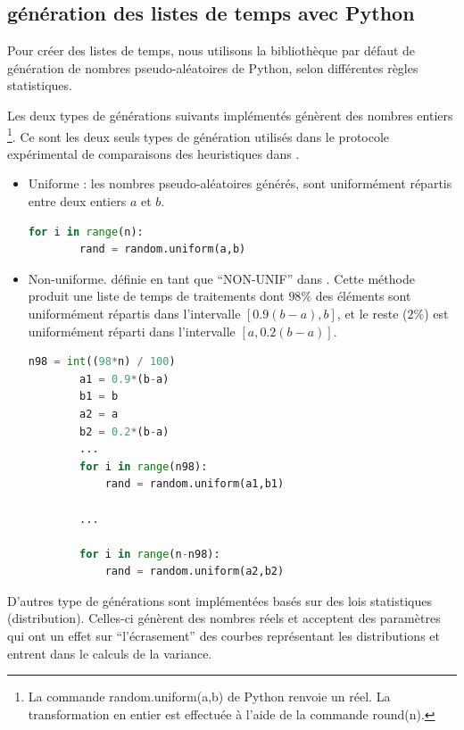 \documentclass[a4paper,12pt]{report}
\theoremstyle{plain}				%
\theoremstyle{definition}				%
\begin{document}
\begin{appendices}

\section*{génération des listes de temps avec Python}

Pour créer des listes de temps, nous utilisons la bibliothèque par défaut de génération de 
  nombres pseudo-aléatoires de Python, selon différentes règles statistiques. 

\bigskip
Les deux types de générations suivants implémentés génèrent des nombres entiers 
\footnote{\samepage La commande random.uniform(a,b) de Python renvoie un réel. La transformation en entier est effectuée à l'aide de la commande round(n).}.
Ce sont les deux seuls types de génération utilisés dans le protocole expérimental de comparaisons des heuristiques dans \cite{della2020longest}.
   
\begin{itemize}
\item Uniforme : les nombres pseudo-aléatoires générés, sont uniformément répartis 
  entre deux entiers $a$ et $b$.
   
  \begin{lstlisting}[language=Python]
	for i in range(n):
		rand = random.uniform(a,b)
  \end{lstlisting}

\item Non-uniforme. définie en tant que ``NON-UNIF'' dans \cite{frangioni2004multi}. Cette méthode produit
  une liste de temps de traitements dont 
  $98\%$ des éléments sont uniformément répartis dans l’intervalle  $[0.9 (b-a), b]$, et 
  le reste ($2\%$) est uniformément réparti dans l'intervalle  $[a, 0.2 (b-a)]$.


  \begin{lstlisting}[language=Python]
	n98 = int((98*n) / 100)
	    a1 = 0.9*(b-a)
    	b1 = b
    	a2 = a
    	b2 = 0.2*(b-a)
		...
    	for i in range(n98):
       		rand = random.uniform(a1,b1)

    	...
    
    	for i in range(n-n98):
    		rand = random.uniform(a2,b2)
  \end{lstlisting}
  
\end{itemize}

\bigskip
D'autres type de générations sont implémentées basés sur des lois statistiques (distribution). 
Celles-ci génèrent des nombres réels et acceptent des paramètres qui ont un effet sur 
  ``l'écrasement'' des courbes représentant les distributions et entrent dans le calculs 
  de la variance.


\end{appendices}
\end{document}

